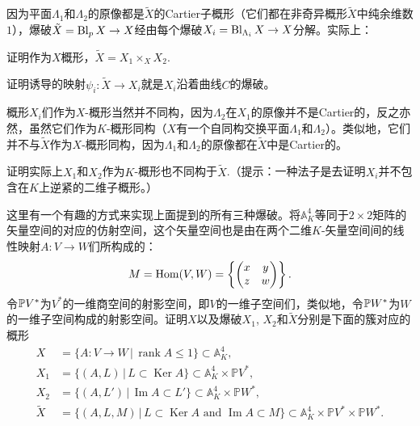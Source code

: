 因为平面$\Lambda_1$和$\Lambda_2$的原像都是$\tilde X$的Cartier子概形（它们都在非奇异概形$\tilde X$中纯余维数$1$），爆破$\tilde X=\operatorname{Bl}_pX\to X$经由每个爆破$X_i=\operatorname{Bl}_{\Lambda_i}X\to X$分解。实际上：

\begin{exe}\label{exe:4.31} 
	\begin{compactenum}[(a)]
		\item 证明作为$X$概形，$\tilde X=X_1\times_X X_2$.
		\item 证明诱导的映射$\psi_i:\tilde X\to X_i$就是$X_i$沿着曲线$C$的爆破。
	\end{compactenum}
\end{exe}

概形$X_i$们作为$X$-概形当然并不同构，因为$\Lambda_2$在$X_1$的原像并不是Cartier的，反之亦然，虽然它们作为$K$-概形同构（$X$有一个自同构交换平面$\Lambda_1$和$\Lambda_2$）。类似地，它们并不与$\tilde X$作为$X$-概形同构，因为$\Lambda_1$和$\Lambda_2$的原像都在$\tilde X$中是Cartier的。

\begin{exe}\label{exe:4.32} 
	证明实际上$X_1$和$X_2$作为$K$-概形也不同构于$\tilde X$.（提示：一种法子是去证明$X_i$并不包含在$K$上逆紧的二维子概形。）
\end{exe}

\begin{exe}\label{exe:4.33} 
	这里有一个有趣的方式来实现上面提到的所有三种爆破。将$\mathbb A_K^4$等同于$2\times 2$矩阵的矢量空间的对应的仿射空间，这个矢量空间也是由在两个二维$K$-矢量空间间的线性映射$A:V\to W$们所构成的：
	\[
	M=\operatorname{Hom}(V,W)=\left\{\begin{pmatrix}x&y\\z&w\end{pmatrix}\right\}.
	\]
	令$\mathbb{P} V^*$为$V^*$的一维商空间的射影空间，即$V$的一维子空间们，类似地，令$\mathbb{P} W^*$为$W$的一维子空间构成的射影空间。证明$X$以及爆破$X_1$, $X_2$和$\tilde X$分别是下面的簇对应的概形
	\[
	\begin{aligned}
		X&=\{A:V\to W\,|\,\operatorname{rank}A\leq 1\}\subset \mathbb A_K^4,\\
		X_1&=\{(A,L)\,|\,L\subset \operatorname{Ker}A\}\subset \mathbb A_K^4\times \mathbb PV^*,\\
		X_2&=\{(A,L')\,|\,\operatorname{Im}A\subset L'\}\subset \mathbb A_K^4\times \mathbb PW^*,\\
		\tilde X&=\{(A,L,M)\,|\, L\subset \operatorname{Ker}A\text{ and }\operatorname{Im}A\subset M\}\subset \mathbb A_K^4\times \mathbb PV^*\times \mathbb PW^*.
	\end{aligned}
	\]
\end{exe}


